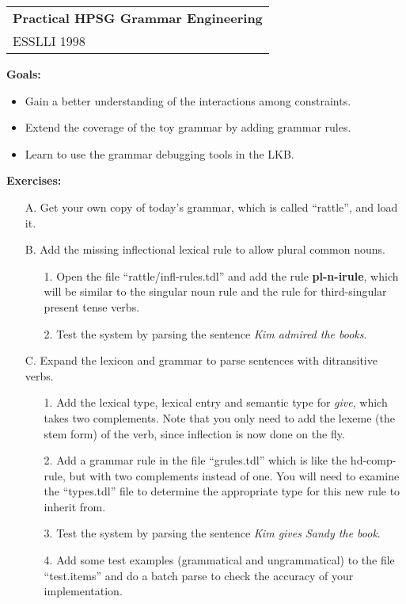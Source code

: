 \documentclass[10pt]{article}
\begin{document}
\begin{tabular}[t]{@{}l@{}}
\textbf{Practical HPSG Grammar Engineering}\\
ESSLLI 1998
\end{tabular}
\hfill
\mbox{}

\medskip
\textbf{Goals:}
\begin{itemize}
\item Gain a better understanding of the interactions among constraints.
\item Extend the coverage of the toy grammar by adding grammar rules.
\item Learn to use the grammar debugging tools in the LKB.
\end{itemize}

\smallskip
\textbf{Exercises:}
\begin{itemize}
\item[A.] Get your own copy of today's grammar, which is called
``rattle'', and load it.
\item[B.] Add the missing inflectional lexical rule to allow plural common nouns. 
\begin{itemize}
\item[1.] Open the file ``rattle/infl-rules.tdl'' and add the rule \textbf{pl-n-irule}, which will be similar to the singular noun rule and the rule for third-singular present tense verbs.
\item[2.] Test the system by parsing the sentence \emph{Kim admired the books}.
\end{itemize}
\item[C.] Expand the lexicon and grammar to parse sentences with ditransitive verbs.
\begin{itemize}
\item[1.] Add the lexical type, lexical entry and semantic type for \emph{give}, which takes two complements.  Note that you only need to add the lexeme (the stem form) of the verb, since inflection is now done on the fly.
\item[2.] Add a grammar rule in the file ``grules.tdl'' which is like the \textsf{hd-comp-rule}, but with two complements instead of one. You will need to examine the ``types.tdl'' file to determine the appropriate type for this new rule to inherit from.
\item[3.] Test the system by parsing the sentence \emph{Kim gives Sandy the book}.
\item[4.] Add some test examples (grammatical and ungrammatical) to the
file ``test.items''  and do a batch parse to check the accuracy of your implementation.

\end{itemize}
\end{itemize}
\end{document}
